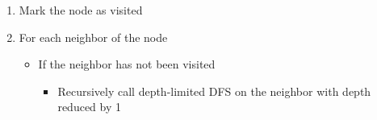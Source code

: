 \documentclass[12pt]{fphw}
\begin{document}
\begin{enumerate}
\begin{enumerate}
\begin{itemize}
            \begin{enumerate}
              \item Mark the node as visited
              \item For each neighbor of the node 
                \begin{itemize}
                  \item If the neighbor has not been visited
                    \begin{itemize}
                      \item Recursively call depth-limited DFS on the neighbor with depth reduced by 1
                    \end{itemize}
                \end{itemize}
            \end{enumerate}
        \end{itemize}
    \end{enumerate}
\end{enumerate}
\end{document}
